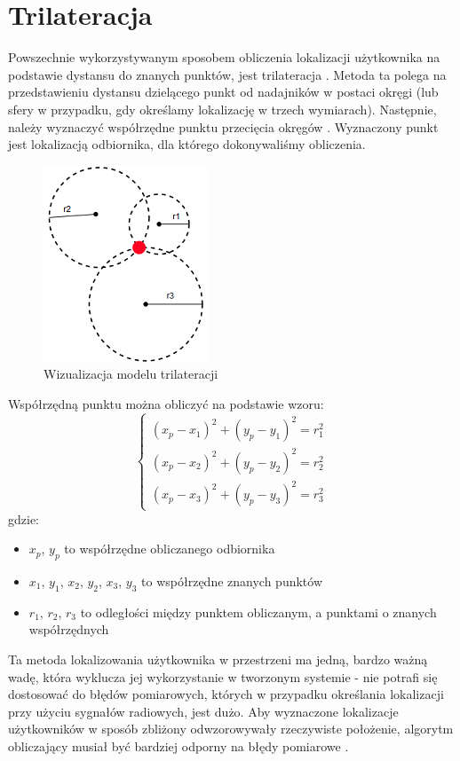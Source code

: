 \section{Trilateracja}
Powszechnie wykorzystywanym sposobem obliczenia lokalizacji użytkownika na podstawie dystansu do znanych punktów, jest trilateracja \cite{MS}. Metoda ta polega na przedstawieniu dystansu dzielącego punkt od nadajników w postaci okręgi (lub sfery w przypadku, gdy określamy lokalizację w trzech wymiarach). Następnie, należy wyznaczyć współrzędne punktu przecięcia okręgów \cite{MS}. Wyznaczony punkt jest lokalizacją odbiornika, dla którego dokonywaliśmy obliczenia.
\begin{figure}[H]			
	\centering
	\caption{Wizualizacja modelu trilateracji}
	\includegraphics{trilateracja}
\end{figure}
Współrzędną punktu można obliczyć na podstawie wzoru:
\begin{equation}
\left\{
\begin{array}{l}
(x_p-x_1)^2 + (y_p - y_1)^2 = r_1^2\\
(x_p-x_2)^2 + (y_p - y_2)^2 = r_2^2\\
(x_p-x_3)^2 + (y_p - y_3)^2 = r_3^2
\end{array}
\right.
\end{equation}
gdzie:
\begin{itemize}
	\item $x_p$, $y_p$ to współrzędne obliczanego odbiornika
	\item $x_1$, $y_1$, $x_2$, $y_2$, $x_3$, $y_3$ to współrzędne znanych punktów
	\item $r_1$, $r_2$, $r_3$ to odległości między punktem obliczanym, a punktami o znanych współrzędnych
\end{itemize}
Ta metoda lokalizowania użytkownika w przestrzeni ma jedną, bardzo ważną wadę, która wyklucza jej wykorzystanie w tworzonym systemie - nie potrafi się dostosować do błędów pomiarowych, których w przypadku określania lokalizacji przy użyciu sygnałów radiowych, jest dużo. Aby wyznaczone lokalizacje użytkowników w sposób zbliżony odwzorowywały rzeczywiste położenie, algorytm obliczający musiał być bardziej odporny na błędy pomiarowe \cite{MT}.
